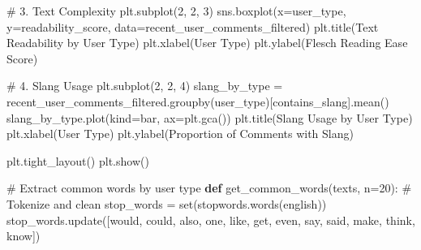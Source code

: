 \documentclass[
  12pt,
  letterpaper,
  DIV=11,
  numbers=noendperiod]{scrartcl}
\newenvironment{Shaded}{\begin{snugshade}}{\end{snugshade}}
\newcommand{\BuiltInTok}[1]{\textcolor[rgb]{0.00,0.23,0.31}{#1}}
\newcommand{\CommentTok}[1]{\textcolor[rgb]{0.37,0.37,0.37}{#1}}
\newcommand{\DecValTok}[1]{\textcolor[rgb]{0.68,0.00,0.00}{#1}}
\newcommand{\KeywordTok}[1]{\textcolor[rgb]{0.00,0.23,0.31}{\textbf{#1}}}
\newcommand{\NormalTok}[1]{\textcolor[rgb]{0.00,0.23,0.31}{#1}}
\newcommand{\OperatorTok}[1]{\textcolor[rgb]{0.37,0.37,0.37}{#1}}
\newcommand{\StringTok}[1]{\textcolor[rgb]{0.13,0.47,0.30}{#1}}
\begin{document}
\begin{Shaded}
\begin{Highlighting}[]
\CommentTok{\# 3. Text Complexity}
\NormalTok{plt.subplot(}\DecValTok{2}\NormalTok{, }\DecValTok{2}\NormalTok{, }\DecValTok{3}\NormalTok{)}
\NormalTok{sns.boxplot(x}\OperatorTok{=}\StringTok{\textquotesingle{}user\_type\textquotesingle{}}\NormalTok{, y}\OperatorTok{=}\StringTok{\textquotesingle{}readability\_score\textquotesingle{}}\NormalTok{, data}\OperatorTok{=}\NormalTok{recent\_user\_comments\_filtered)}
\NormalTok{plt.title(}\StringTok{\textquotesingle{}Text Readability by User Type\textquotesingle{}}\NormalTok{)}
\NormalTok{plt.xlabel(}\StringTok{\textquotesingle{}User Type\textquotesingle{}}\NormalTok{)}
\NormalTok{plt.ylabel(}\StringTok{\textquotesingle{}Flesch Reading Ease Score\textquotesingle{}}\NormalTok{)}

\CommentTok{\# 4. Slang Usage}
\NormalTok{plt.subplot(}\DecValTok{2}\NormalTok{, }\DecValTok{2}\NormalTok{, }\DecValTok{4}\NormalTok{)}
\NormalTok{slang\_by\_type }\OperatorTok{=}\NormalTok{ recent\_user\_comments\_filtered.groupby(}\StringTok{\textquotesingle{}user\_type\textquotesingle{}}\NormalTok{)[}\StringTok{\textquotesingle{}contains\_slang\textquotesingle{}}\NormalTok{].mean()}
\NormalTok{slang\_by\_type.plot(kind}\OperatorTok{=}\StringTok{\textquotesingle{}bar\textquotesingle{}}\NormalTok{, ax}\OperatorTok{=}\NormalTok{plt.gca())}
\NormalTok{plt.title(}\StringTok{\textquotesingle{}Slang Usage by User Type\textquotesingle{}}\NormalTok{)}
\NormalTok{plt.xlabel(}\StringTok{\textquotesingle{}User Type\textquotesingle{}}\NormalTok{)}
\NormalTok{plt.ylabel(}\StringTok{\textquotesingle{}Proportion of Comments with Slang\textquotesingle{}}\NormalTok{)}

\NormalTok{plt.tight\_layout()}
\NormalTok{plt.show()}

\CommentTok{\# Extract common words by user type}
\KeywordTok{def}\NormalTok{ get\_common\_words(texts, n}\OperatorTok{=}\DecValTok{20}\NormalTok{):}
    \CommentTok{\# Tokenize and clean}
\NormalTok{    stop\_words }\OperatorTok{=} \BuiltInTok{set}\NormalTok{(stopwords.words(}\StringTok{\textquotesingle{}english\textquotesingle{}}\NormalTok{))}
\NormalTok{    stop\_words.update([}\StringTok{\textquotesingle{}would\textquotesingle{}}\NormalTok{, }\StringTok{\textquotesingle{}could\textquotesingle{}}\NormalTok{, }\StringTok{\textquotesingle{}also\textquotesingle{}}\NormalTok{, }\StringTok{\textquotesingle{}one\textquotesingle{}}\NormalTok{, }\StringTok{\textquotesingle{}like\textquotesingle{}}\NormalTok{, }\StringTok{\textquotesingle{}get\textquotesingle{}}\NormalTok{, }\StringTok{\textquotesingle{}even\textquotesingle{}}\NormalTok{, }\StringTok{\textquotesingle{}say\textquotesingle{}}\NormalTok{, }\StringTok{\textquotesingle{}said\textquotesingle{}}\NormalTok{, }\StringTok{\textquotesingle{}make\textquotesingle{}}\NormalTok{, }\StringTok{\textquotesingle{}think\textquotesingle{}}\NormalTok{, }\StringTok{\textquotesingle{}know\textquotesingle{}}\NormalTok{])}
    

\end{Highlighting}
\end{Shaded}
\end{document}
